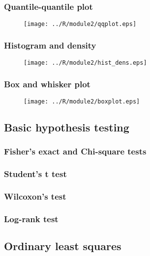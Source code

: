 \documentclass{beamer}
\begin{document}
\begin{frame}[fragile]
    \frametitle{Quantile-quantile plot}
    \begin{figure}[b]
      \centering
      \texttt{[image: ../R/module2/qqplot.eps]}
    \end{figure}
\end{frame}


\begin{frame}[fragile]
    \frametitle{Histogram and density}
    \begin{figure}[b]
      \centering
      \texttt{[image: ../R/module2/hist\_dens.eps]}
    \end{figure}
\end{frame}


\begin{frame}[fragile]
    \frametitle{Box and whisker plot}
    \begin{figure}[b]
      \centering
      \texttt{[image: ../R/module2/boxplot.eps]}
    \end{figure}
\end{frame}


\subsection{Basic hypothesis testing}

\begin{frame}[fragile]
    \frametitle{Fisher's exact and Chi-square tests}
    
\end{frame}


\begin{frame}[fragile]
    \frametitle{Student's t test}
    
\end{frame}


\begin{frame}[fragile]
    \frametitle{Wilcoxon's test}
    
\end{frame}


\begin{frame}[fragile]
    \frametitle{Log-rank test}
    
\end{frame}


\subsection{Ordinary least squares}
\end{document}
